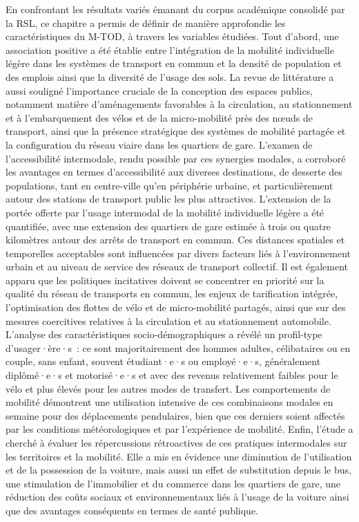 \begin{refsegment}
En confrontant les résultats variés émanant du corpus académique consolidé par la \acrshort{RSL}, ce chapitre a permis de définir de manière approfondie les caractéristiques du \acrshort{M-TOD}, à travers les variables étudiées. Tout d'abord, une association positive a été établie entre l'intégration de la mobilité individuelle légère dans les systèmes de transport en commun et la densité de population et des emplois ainsi que la diversité de l'usage des sols. La revue de littérature a aussi souligné l'importance cruciale de la conception des espaces publics, notamment matière d'aménagements favorables à la circulation, au stationnement et à l'embarquement des vélos et de la micro-mobilité près des nœuds de transport, ainsi que la présence stratégique des systèmes de mobilité partagée et la configuration du réseau viaire dans les quartiers de gare. L'examen de l'accessibilité intermodale, rendu possible par ces synergies modales, a corroboré les avantages en termes d'accessibilité aux diverses destinations, de desserte des populations, tant en centre-ville qu'en périphérie urbaine, et particulièrement autour des stations de transport public les plus attractives. L'extension de la portée offerte par l'usage intermodal de la mobilité individuelle légère a été quantifiée, avec une extension des quartiers de gare estimée à trois ou quatre kilomètres autour des arrêts de transport en commun. Ces distances spatiales et temporelles acceptables sont influencées par divers facteurs liés à l'environnement urbain et au niveau de service des réseaux de transport collectif. Il est également apparu que les politiques incitatives doivent se concentrer en priorité sur la qualité du réseau de transports en commun, les enjeux de tarification intégrée, l'optimisation des flottes de vélo et de micro-mobilité partagés, ainsi que sur des mesures coercitives relatives à la circulation et au stationnement automobile. L'analyse des caractéristiques socio-démographiques a révélé un profil-type d'usager·ère·s~: ce sont majoritairement des hommes adultes, célibataires ou en couple, sans enfant, souvent étudiant·e·s ou employé·e·s, généralement diplômé·e·s et motorisé·e·s et avec des revenus relativement faibles pour le vélo et plus élevés pour les autres modes de transfert. Les comportements de mobilité démontrent une utilisation intensive de ces combinaisons modales en semaine pour des déplacements pendulaires, bien que ces derniers soient affectés par les conditions météorologiques et par l'expérience de mobilité. Enfin, l'étude a cherché à évaluer les répercussions rétroactives de ces pratiques intermodales sur les territoires et la mobilité. Elle a mis en évidence une diminution de l'utilisation et de la possession de la voiture, mais aussi un effet de substitution depuis le bus, une stimulation de l'immobilier et du commerce dans les quartiers de gare, une réduction des coûts sociaux et environnementaux liés à l'usage de la voiture ainsi que des avantages conséquents en termes de santé publique.%


\end{refsegment}
